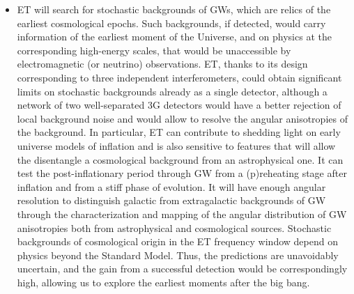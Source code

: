 \begin{itemize}
\item ET will search for stochastic backgrounds of GWs, which are relics of the earliest cosmological epochs. 
Such backgrounds, if detected, would carry information of the earliest moment of the Universe, and on physics at the corresponding high-energy scales, that would be unaccessible  by electromagnetic (or neutrino) observations. ET, thanks to its design corresponding to three independent interferometers, could obtain significant limits on stochastic backgrounds already as a single detector, although  a network of two well-separated 3G detectors  would have a better rejection of local background noise and would allow to resolve the angular anisotropies of the background.
In particular,  ET can contribute to shedding light on early universe models of inflation and is also sensitive to features that will allow the disentangle a cosmological background from an astrophysical one. It can test the post-inflationary period through GW from a (p)reheating stage after inflation and from a stiff phase of evolution. It  will have enough angular resolution to distinguish galactic from extragalactic backgrounds of GW through the characterization and mapping of the angular distribution of GW anisotropies both from astrophysical and cosmological sources.  
Stochastic backgrounds of cosmological origin in the ET frequency window depend on physics beyond the Standard Model. Thus, the  predictions are unavoidably uncertain, and the gain from a successful detection would be correspondingly high, allowing us to explore the earliest moments after the big bang.


\end{itemize}



%
%

%


